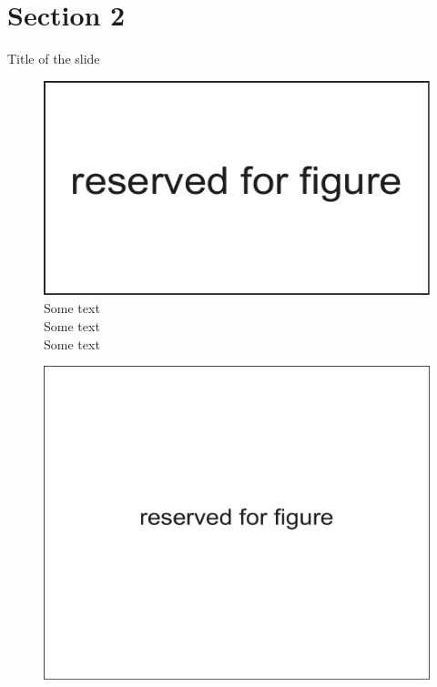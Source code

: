 \documentclass[russian,12pt,aspectratio=169,xcolor=table]{beamer}
\begin{document}
\section{Section 2}
\begin{frame}{Title of the slide}
  \begin{minipage}{.42\textwidth}
    \begin{figure}
      \centering
      \includegraphics[width=\textwidth]{img/4}\\
      \vspace{.8ex}
        Some text\\
        \vspace{.5ex}
        Some text\\
        \vspace{.5ex}
        Some text
    \end{figure}
  \end{minipage} \hfill
  \begin{minipage}{.57\textwidth}
    \begin{figure}
      \centering
      \includegraphics[width=\textwidth]{img/5}
    \end{figure}
  \end{minipage}
\end{frame}
\end{document}
